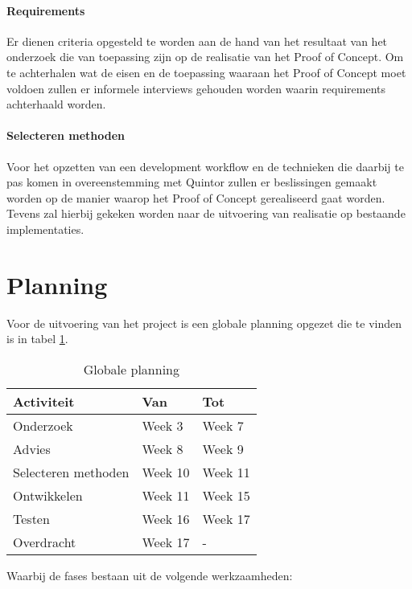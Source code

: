 \paragraph{Requirements} Er dienen criteria opgesteld te worden aan de hand van het resultaat van het onderzoek die van toepassing zijn op de realisatie van het Proof of Concept. Om te achterhalen wat de eisen en de toepassing waaraan het Proof of Concept moet voldoen zullen er informele interviews gehouden worden waarin requirements achterhaald worden.

\paragraph{Selecteren methoden} Voor het opzetten van een development workflow en de technieken die daarbij te pas komen in overeenstemming met Quintor zullen er beslissingen gemaakt worden op de manier waarop het Proof of Concept gerealiseerd gaat worden. Tevens zal hierbij gekeken worden naar de uitvoering van realisatie op bestaande implementaties.

\clearpage
\section{Planning}
Voor de uitvoering van het project is een globale planning opgezet die te vinden is in tabel \ref{planning}.

\begin{table}[ht]
  \begin{tabular}{|p{6cm}|p{4cm}|p{4cm}|}
    \hline
    \textbf{Activiteit} & \textbf{Van} & \textbf{Tot} \\
    \hline
    Onderzoek & Week 3 & Week 7 \\
    \hline
    Advies & Week 8 & Week 9 \\
    \hline
    Selecteren methoden & Week 10 & Week 11 \\
    \hline
    Ontwikkelen & Week 11 & Week 15 \\
    \hline
    Testen & Week 16 & Week 17 \\
    \hline
    Overdracht & Week 17 & - \\
    \hline
  \end{tabular}
  \caption{Globale planning}
  \label{planning}
\end{table}

Waarbij de fases bestaan uit de volgende werkzaamheden:

